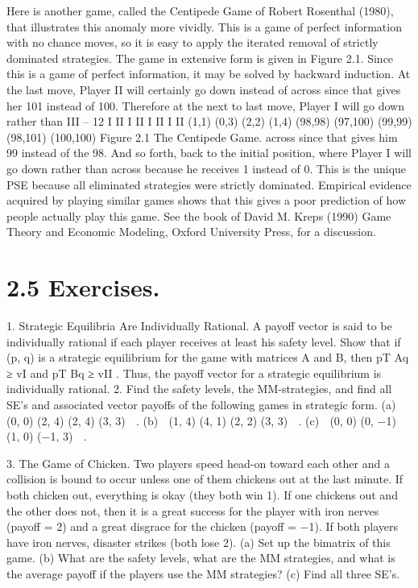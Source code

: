 \documentclass{article}
\begin{document}
Here is another game, called the Centipede Game of Robert Rosenthal (1980), that
illustrates this anomaly more vividly. This is a game of perfect information with no chance
moves, so it is easy to apply the iterated removal of strictly dominated strategies. The
game in extensive form is given in Figure 2.1.
Since this is a game of perfect information, it may be solved by backward induction.
At the last move, Player II will certainly go down instead of across since that gives her
101 instead of 100. Therefore at the next to last move, Player I will go down rather than
III – 12
I II I II I II I II
(1,1) (0,3) (2,2) (1,4) (98,98) (97,100) (99,99) (98,101)
(100,100)
Figure 2.1 The Centipede Game.
across since that gives him 99 instead of the 98. And so forth, back to the initial position,
where Player I will go down rather than across because he receives 1 instead of 0. This is
the unique PSE because all eliminated strategies were strictly dominated.
Empirical evidence acquired by playing similar games shows that this gives a poor
prediction of how people actually play this game. See the book of David M. Kreps (1990)
Game Theory and Economic Modeling, Oxford University Press, for a discussion.
\section{2.5 Exercises.}
1. Strategic Equilibria Are Individually Rational. A payoff vector is said to
be individually rational if each player receives at least his safety level. Show that if (p, q)
is a strategic equilibrium for the game with matrices A and B, then pT
Aq ≥ vI and
pT
Bq ≥ vII . Thus, the payoff vector for a strategic equilibrium is individually rational.
2. Find the safety levels, the MM-strategies, and find all SE’s and associated vector
payoffs of the following games in strategic form.
(a)  (0, 0) (2, 4)
(2, 4) (3, 3) 
. (b)  (1, 4) (4, 1)
(2, 2) (3, 3) 
. (c)  (0, 0) (0, −1)
(1, 0) (−1, 3) 
.


3. The Game of Chicken. Two players speed head-on toward each other and a
collision is bound to occur unless one of them chickens out at the last minute. If both
chicken out, everything is okay (they both win 1). If one chickens out and the other does
not, then it is a great success for the player with iron nerves (payoff = 2) and a great
disgrace for the chicken (payoff = −1). If both players have iron nerves, disaster strikes
(both lose 2).
(a) Set up the bimatrix of this game.
(b) What are the safety levels, what are the MM strategies, and what is the average payoff
if the players use the MM strategies?
(c) Find all three SE’s.
\end{document}
